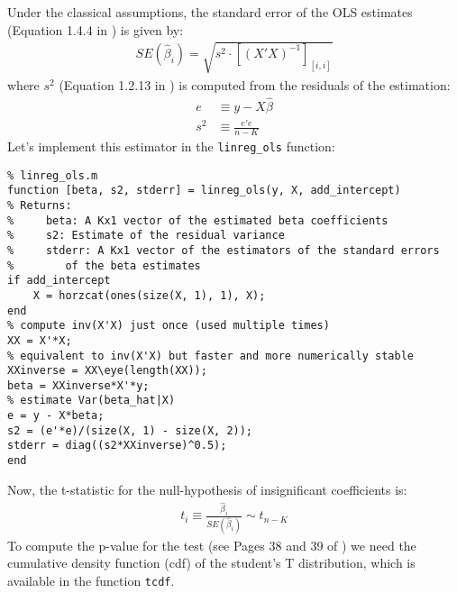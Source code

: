 \documentclass[12pt, a4paper]{article}
\begin{document}
Under the classical assumptions, the standard error of the OLS estimates (Equation 1.4.4 in \citet{H2000}) is given by:
\begin{align*}
SE(\hat{\beta}_i) = \sqrt{s^2\cdot[(X'X)^{-1}]_{[i, i]}}
\end{align*}
where \(s^2\) (Equation 1.2.13 in \citet{H2000}) is computed from the residuals of the estimation:
\begin{align*}
e&\equiv y-X\hat{\beta}\\
s^2&\equiv\frac{e'e}{n-K}
\end{align*}
Let's implement this estimator in the \texttt{linreg\_ols} function:
\lstset{language=matlab,label= ,caption= ,captionpos=b,firstnumber=1,numbers=left,style=Matlab-editor}
\begin{lstlisting}
% linreg_ols.m
function [beta, s2, stderr] = linreg_ols(y, X, add_intercept)
% Returns:
%     beta: A Kx1 vector of the estimated beta coefficients
%     s2: Estimate of the residual variance
%     stderr: A Kx1 vector of the estimators of the standard errors
%        of the beta estimates
if add_intercept
    X = horzcat(ones(size(X, 1), 1), X);
end
% compute inv(X'X) just once (used multiple times)
XX = X'*X;
% equivalent to inv(X'X) but faster and more numerically stable
XXinverse = XX\eye(length(XX));
beta = XXinverse*X'*y;
% estimate Var(beta_hat|X)
e = y - X*beta;
s2 = (e'*e)/(size(X, 1) - size(X, 2));
stderr = diag((s2*XXinverse)^0.5);
end
\end{lstlisting}
Now, the t-statistic for the null-hypothesis of insignificant coefficients is:
\begin{align*}
t_i\equiv\frac{\hat{\beta}_i}{SE(\hat{\beta}_i)}\sim t_{n-K}
\end{align*}
To compute the p-value for the test (see Pages 38 and 39 of \citet{H2000}) we need the cumulative density function (cdf) of the student's T distribution, which is available in the function \texttt{tcdf}.
\lstset{language=matlab,label= ,caption= ,captionpos=b,firstnumber=1,numbers=left,style=Matlab-editor}
\end{document}
